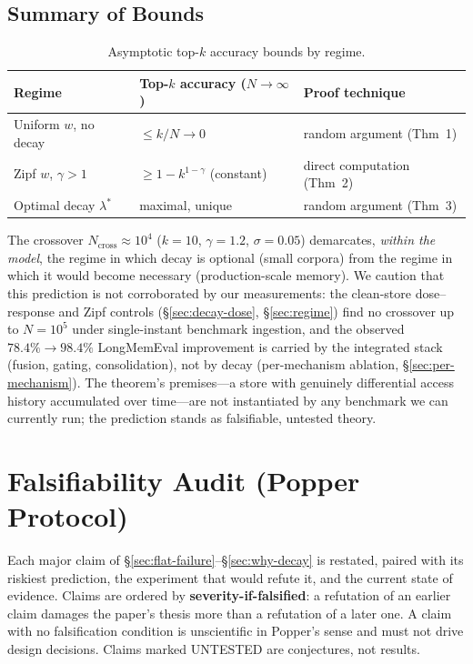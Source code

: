 \documentclass[11pt]{article}
\begin{document}
\subsection{Summary of Bounds}
\label{app:erdos-summary}

\begin{table}[h]
\centering
\caption{Asymptotic top-$k$ accuracy bounds by regime.}
\label{tab:erdos-summary}
\begin{tabular}{lll}
\toprule
Regime & Top-$k$ accuracy ($N \to \infty$) & Proof technique \\
\midrule
Uniform $w$, no decay & $\le k/N \to 0$           & random argument (Thm~1) \\
Zipf $w$, $\gamma > 1$ & $\ge 1 - k^{1-\gamma}$ (constant) & direct computation (Thm~2) \\
Optimal decay $\lambda^*$ & maximal, unique       & random argument (Thm~3) \\
\bottomrule
\end{tabular}
\end{table}

The crossover $N_{\mathrm{cross}} \approx 10^4$ ($k=10$,
$\gamma=1.2$, $\sigma=0.05$) demarcates, \emph{within the model},
the regime in which decay is optional (small corpora) from the
regime in which it would become necessary (production-scale
memory).  We caution that this prediction is not corroborated by
our measurements: the clean-store dose--response and Zipf controls
(\S\ref{sec:decay-dose}, \S\ref{sec:regime}) find no crossover up
to $N = 10^5$ under single-instant benchmark ingestion, and the
observed $78.4\% \to 98.4\%$ LongMemEval improvement is carried by
the integrated stack (fusion, gating, consolidation), not by decay
(per-mechanism ablation, \S\ref{sec:per-mechanism}).  The theorem's
premises---a store with genuinely differential access history
accumulated over time---are not instantiated by any benchmark we
can currently run; the prediction stands as falsifiable, untested
theory.

\section{Falsifiability Audit (Popper Protocol)}
\label{app:popper}

Each major claim of \S\ref{sec:flat-failure}--\S\ref{sec:why-decay}
is restated, paired with its riskiest prediction, the experiment
that would refute it, and the current state of evidence.  Claims
are ordered by \textbf{severity-if-falsified}: a refutation of an
earlier claim damages the paper's thesis more than a refutation of
a later one.  A claim with no falsification condition is
unscientific in Popper's sense and must not drive design decisions.
Claims marked UNTESTED are conjectures, not results.
\end{document}
